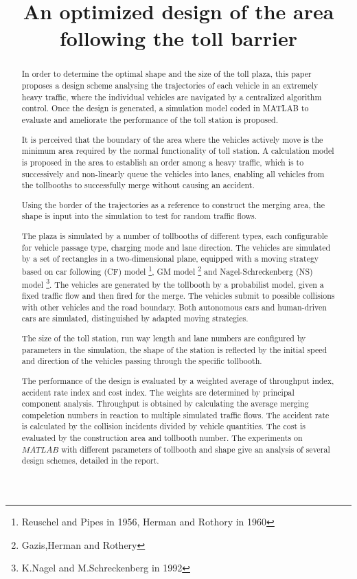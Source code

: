 \documentclass{mcmthesis}
\title{An optimized design of the area following the toll barrier }
\begin{document}
	
	
\begin{abstract}
	
In order to determine the optimal shape and the size of the toll plaza, this paper proposes a design scheme analysing the trajectories of each vehicle in an extremely heavy traffic, where the individual vehicles are navigated by a centralized algorithm control. Once the design is generated, a simulation model coded in MATLAB to evaluate and ameliorate the performance of the toll station is proposed.

It is perceived that the boundary of the area where the vehicles actively move is the minimum area required by the normal functionality of toll station. A calculation model is proposed in the area to establish an order among a heavy traffic, which is to successively and non-linearly queue the vehicles into lanes, enabling all vehicles from the tollbooths to successfully merge without causing an accident. 

Using the border of the trajectories as a reference to construct the merging area, the shape is input into the simulation to test for random traffic flows. 

The plaza is simulated by a number of tollbooths of different types, each configurable for vehicle passage type, charging mode and lane direction. The vehicles are simulated by a set of rectangles in a two-dimensional plane, equipped with a moving strategy based on car following (CF) model \footnote{Reuschel and Pipes in 1956, Herman and Rothory in 1960}, GM model \footnote{Gazis,Herman and Rothery} and Nagel-Schreckenberg (NS) model \footnote{K.Nagel and M.Schreckenberg in 1992}. The vehicles are generated by the tollbooth by a probabilist model, given a fixed traffic flow and then fired for the merge. The vehicles submit to possible collisions with other vehicles and the road boundary. Both autonomous cars and human-driven cars are simulated, distinguished by adapted moving strategies.

The size of the toll station, run way length and lane numbers are configured by parameters in the simulation, the shape of the station is reflected by the initial speed and direction of the vehicles passing through the specific tollbooth. 

The performance of the design is evaluated by a weighted average of throughput index, accident rate index and cost index. The weights are determined by principal component analysis. Throughput is obtained by calculating the average merging compeletion numbers in reaction to multiple simulated traffic flows. The accident rate is calculated by the collision incidents divided by vehicle quantities. The cost is evaluated by the construction area and tollbooth number. The experiments on $MATLAB$ with different parameters of tollbooth and shape give an analysis of several design schemes, detailed in the report.


\end{abstract}
\end{document}
